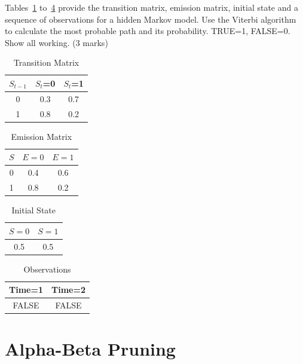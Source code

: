 \documentclass{article}
\begin{document}
Tables~\ref{hmmvit1} to~\ref{hmmvit4} provide the transition matrix, emission matrix, initial state and a sequence of observations for a hidden Markov model. Use the Viterbi algorithm to calculate the most probable path and its probability.  TRUE=1, FALSE=0. Show all working. (3 marks)

\begin{table}[h!]
\caption{Transition Matrix}
\label{hmmvit1}
\begin{center}
\begin{tabular}{ |c||c|c| } 
\hline
 $S_{t-1}$ & $S_t$=0 & $S_t$=1\\
\hline
 0 & 0.3 & 0.7\\
 1 & 0.8 & 0.2\\
\hline
\end{tabular}
\end{center}
\end{table}
\begin{table}[h!]
\caption{Emission Matrix}
\label{hmmvit2}
\begin{center}
\begin{tabular}{ |c||c|c| } 
\hline
 $S$ & $E=0$ & $E=1$\\
\hline
 0 & 0.4 & 0.6\\
 1 & 0.8 & 0.2\\
\hline
\end{tabular}
\end{center}
\end{table}
\begin{table}[h!]
\caption{Initial State}
\label{hmmvit3}
\begin{center}
\begin{tabular}{ |c|c| } 
\hline
 $S=0$ & $S=1$\\
\hline
0.5 & 0.5\\
\hline
\end{tabular}
\end{center}
\end{table}
\begin{table}[h!]
\caption{Observations}
\label{hmmvit4}
\begin{center}
\begin{tabular}{ |c|c| } 
\hline
 Time=1 & Time=2\\
\hline
FALSE & FALSE\\
\hline
\end{tabular}
\end{center}
\end{table}
\clearpage
\section{Alpha-Beta Pruning}
\end{document}
